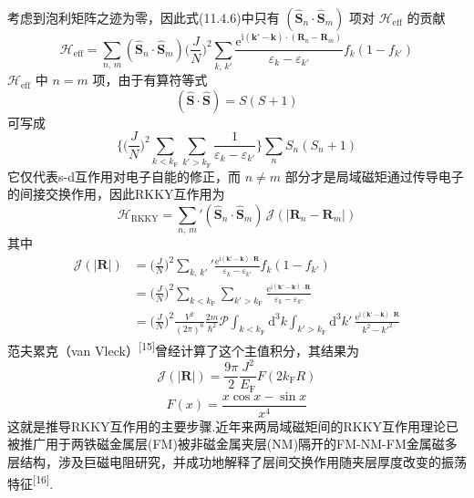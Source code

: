 考虑到泡利矩阵之迹为零，因此式(11.4.6)中只有 $(\hat{\boldsymbol{S}}_{n}\cdot\hat{\boldsymbol{S}}_{m})$ 项对 $\mathscr{H}_{\mathrm{eff}}$ 的贡献
\begin{equation}
  \mathscr{H}_{\mathrm{eff}}
  =\sum_{n,\,m}(\hat{\boldsymbol{S}}_{n}\cdot\hat{\boldsymbol{S}}_{m})
  \biggl(\frac{J}{N}\biggr)^{2}\sum_{k,\,k'}
  \frac{\mathrm{e}^{\mathrm{i}(\boldsymbol{k}'-\boldsymbol{k})\cdot(\boldsymbol{R}_{n}-\boldsymbol{R}_{m})}}
  {\varepsilon_{k}-\varepsilon_{k'}}
  f_{k}(1-f_{k'})
\end{equation}
$\mathscr{H}_{\mathrm{eff}}$ 中 $n=m$ 项，由于有算符等式
\begin{equation}
  (\hat{\boldsymbol{S}}\cdot\hat{\boldsymbol{S}})=S(S+1)
\end{equation}
可写成
\begin{equation}
  \biggl\{\biggl(\frac{J}{N}\biggr)^{2}
  \sum_{k<k_{\mathrm{F}}}\sum_{k'>k_{\mathrm{F}}}
  \frac{1}{\varepsilon_{k}-\varepsilon_{k'}}\biggr\}
  \sum_{n}S_{n}(S_{n}+1)
\end{equation}
它仅代表s-d互作用对电子自能的修正，而 $n\neq m$ 部分才是局域磁矩通过传导电子的间接交换作用，因此RKKY互作用为
\begin{equation}
  \mathscr{H}_{\mathrm{RKKY}}
  ={\sum_{n,\,m}}'(\hat{\boldsymbol{S}}_{n}\cdot\hat{\boldsymbol{S}}_{m})\,
  \mathscr{J}(|\boldsymbol{R}_{n}-\boldsymbol{R}_{m}|)
\end{equation}
其中
\begin{equation}
\begin{aligned}
  \mathscr{J}(|\boldsymbol{R}|)
  &=\biggl(\frac{J}{N}\biggr)^{2}{\sum_{k,\,k'}}'
  \frac{\mathrm{e}^{\mathrm{i}(\boldsymbol{k}'-\boldsymbol{k})\cdot\boldsymbol{R}}}
  {\varepsilon_{k}-\varepsilon_{k'}}f_{k}(1-f_{k'})\\
  &=\biggl(\frac{J}{N}\biggr)^{2}
  \sum_{k<k_{\mathrm{F}}}\sum_{k'>k_{\mathrm{F}}}
  \frac{\mathrm{e}^{\mathrm{i}(\boldsymbol{k}'-\boldsymbol{k})\cdot\boldsymbol{R}}}
  {\varepsilon_{k}-\varepsilon_{k'}}\\
  &=\biggl(\frac{J}{N}\biggr)^{2}\frac{V^{2}}{(2\pi)^{6}}\frac{2m}{\hbar^{2}}
  \mathscr{P}\!\int_{k<k_{\mathrm{F}}}\mathrm{d}^{3}k
  \int_{k'>k_{\mathrm{F}}}\mathrm{d}^{3}k'\,
  \frac{\mathrm{e}^{\mathrm{i}(\boldsymbol{k}'-\boldsymbol{k})\cdot\boldsymbol{R}}}
  {k^{2}-k'^{2}}
\end{aligned}
\end{equation}
范夫累克（van Vleck）\textsuperscript{[15]}曾经计算了这个主值积分，其结果为
\begin{equation}
  \mathscr{J}(|\boldsymbol{R}|)=\frac{9\pi}{2}\frac{J^{2}}{E_{\mathrm{F}}}
  F(2k_{\mathrm{F}}R)
\end{equation}
\begin{equation}
  F(x)=\frac{x\cos x-\sin x}{x^{4}}
\end{equation}
这就是推导RKKY互作用的主要步骤.近年来两局域磁矩间的RKKY互作用理论已被推广用于两铁磁金属层(FM)被非磁金属夹层(NM)隔开的FM-NM-FM金属磁多层结构，涉及巨磁电阻研究，并成功地解释了层间交换作用随夹层厚度改变的振荡特征\textsuperscript{[16]}.

